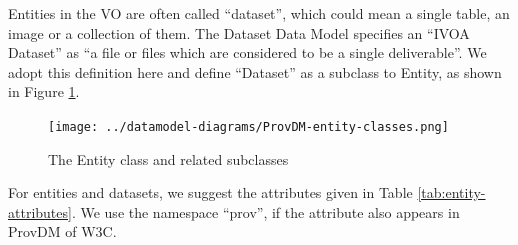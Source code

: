 Entities in the VO are often called ``dataset'', which could mean a single 
table, an image or a collection of them. The Dataset Data Model 
\citep{std:DatasetDM} specifies an ``IVOA Dataset'' as ``a file or files which 
are considered to be a single deliverable''. We adopt this definition here and 
define ``Dataset'' as a subclass to Entity, as shown in Figure \ref{fig:entityclasses}.

\begin{figure}
\centering
\texttt{[image: ../datamodel-diagrams/ProvDM-entity-classes.png]}
\caption{The Entity class and related subclasses}
\label{fig:entityclasses}
\end{figure}

For entities and datasets, we suggest the attributes given in Table \ref{tab:entity-attributes}. 
We use the namespace ``prov'', if the attribute also appears in ProvDM of W3C.

